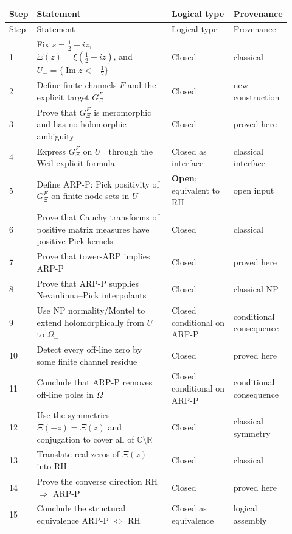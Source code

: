 \documentclass[11pt]{amsart}
\theoremstyle{definition}
\theoremstyle{remark}
\theoremstyle{definition}
\renewcommand{\Im}{\operatorname{Im}}
\newcommand{\half}{\tfrac{1}{2}}
\newcommand{\R}{\mathbb{R}}
\newcommand{\C}{\mathbb{C}}
\newcommand{\GXi}{G_\Xi}
\begin{document}
{\small
\begin{longtable}{@{}p{0.04\linewidth}p{0.48\linewidth}p{0.22\linewidth}p{0.18\linewidth}@{}}
\toprule
Step & Statement & Logical type & Provenance \\
\midrule
\endfirsthead
\toprule
Step & Statement & Logical type & Provenance \\
\midrule
\endhead
1 & Fix $s=\half+iz$, $\Xi(z)=\xi(\half+iz)$, and
$U_-=\{\Im z<-\half\}$ & Closed & classical \\
2 & Define finite channels $F$ and the explicit target $\GXi^F$ & Closed & new construction \\
3 & Prove that $\GXi^F$ is meromorphic and has no holomorphic ambiguity & Closed & proved here \\
4 & Express $\GXi^F$ on $U_-$ through the Weil explicit formula & Closed as interface & classical
interface \\
5 & Define ARP-P: Pick positivity of $\GXi^F$ on finite node sets in $U_-$ & \textbf{Open}; equivalent
to RH & open input \\
6 & Prove that Cauchy transforms of positive matrix measures have positive Pick kernels & Closed &
classical \\
7 & Prove that tower-ARP implies ARP-P & Closed & proved here \\
8 & Prove that ARP-P supplies Nevanlinna--Pick interpolants & Closed & classical NP \\
9 & Use NP normality/Montel to extend holomorphically from $U_-$ to $\Omega_-$ & Closed conditional on
ARP-P & conditional consequence \\
10 & Detect every off-line zero by some finite channel residue & Closed & proved here \\
11 & Conclude that ARP-P removes off-line poles in $\Omega_-$ & Closed conditional on ARP-P &
conditional consequence \\
12 & Use the symmetries $\Xi(-z)=\Xi(z)$ and conjugation to cover all of $\C\setminus\R$ & Closed &
classical symmetry \\
13 & Translate real zeros of $\Xi(z)$ into RH & Closed & classical \\
14 & Prove the converse direction RH $\Rightarrow$ ARP-P & Closed & proved here \\
15 & Conclude the structural equivalence ARP-P $\Longleftrightarrow$ RH & Closed as equivalence &
logical assembly \\
\bottomrule
\end{longtable}
}
\end{document}
